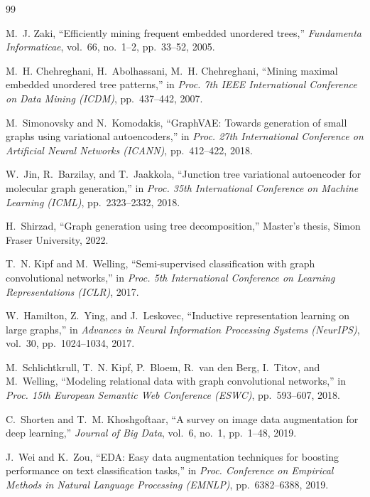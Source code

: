 \documentclass[submit,techrep,noauthor]{ipsj}
\begin{document}
\begin{thebibliography}{99}

M.~J. Zaki,
``Efficiently mining frequent embedded unordered trees,''
\textit{Fundamenta Informaticae},
vol.~66, no.~1--2, pp.~33--52, 2005.

M.~H. Chehreghani, H.~Abolhassani, M.~H. Chehreghani,
``Mining maximal embedded unordered tree patterns,''
in \textit{Proc. 7th IEEE International Conference on Data Mining (ICDM)},
pp.~437--442, 2007.

M.~Simonovsky and N.~Komodakis,
``GraphVAE: Towards generation of small graphs using variational autoencoders,''
in \textit{Proc. 27th International Conference on Artificial Neural Networks (ICANN)},
pp.~412--422, 2018.

W.~Jin, R.~Barzilay, and T.~Jaakkola,
``Junction tree variational autoencoder for molecular graph generation,''
in \textit{Proc. 35th International Conference on Machine Learning (ICML)},
pp.~2323--2332, 2018.

H.~Shirzad,
``Graph generation using tree decomposition,''
Master's thesis, Simon Fraser University, 2022.

T.~N. Kipf and M.~Welling,
``Semi-supervised classification with graph convolutional networks,''
in \textit{Proc. 5th International Conference on Learning Representations (ICLR)},
2017.

W.~Hamilton, Z.~Ying, and J.~Leskovec,
``Inductive representation learning on large graphs,''
in \textit{Advances in Neural Information Processing Systems (NeurIPS)},
vol.~30, pp.~1024--1034, 2017.

M.~Schlichtkrull, T.~N. Kipf, P.~Bloem, R.~van den Berg, I.~Titov, and M.~Welling,
``Modeling relational data with graph convolutional networks,''
in \textit{Proc. 15th European Semantic Web Conference (ESWC)},
pp.~593--607, 2018.

C.~Shorten and T.~M. Khoshgoftaar,
``A survey on image data augmentation for deep learning,''
\textit{Journal of Big Data},
vol.~6, no.~1, pp.~1--48, 2019.

J.~Wei and K.~Zou,
``EDA: Easy data augmentation techniques for boosting performance on text classification tasks,''
in \textit{Proc. Conference on Empirical Methods in Natural Language Processing (EMNLP)},
pp.~6382--6388, 2019.

\end{thebibliography}
\end{document}
